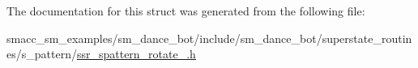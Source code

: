 The documentation for this struct was generated from the following file\+:\begin{DoxyCompactItemize}
\item 
smacc\+\_\+sm\+\_\+examples/sm\+\_\+dance\+\_\+bot/include/sm\+\_\+dance\+\_\+bot/superstate\+\_\+routines/s\+\_\+pattern/\hyperlink{ssr__spattern__rotate__2_8h}{ssr\+\_\+spattern\+\_\+rotate\+\_.\+h}\end{DoxyCompactItemize}
